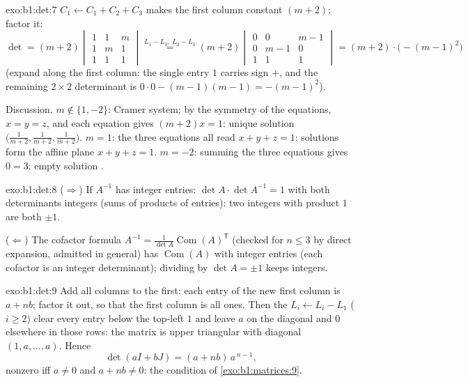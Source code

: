 \begin{solution}{exo:b1:det:7}
$C_1 \leftarrow C_1 + C_2 + C_3$ makes the first column constant
$(m+2)$; factor it:
\[
\det = (m+2)\begin{vmatrix}
1 & 1 & m\\ 1 & m & 1\\ 1 & 1 & 1
\end{vmatrix}
\overset{L_1 - L_3,\ L_2 - L_3}{=}
(m+2)\begin{vmatrix}
0 & 0 & m-1\\ 0 & m-1 & 0\\ 1 & 1 & 1
\end{vmatrix}
= (m+2)\cdot\bigl(-(m-1)^2\bigr)
\]
(expand along the first column: the single entry $1$ carries sign
$+$, and the remaining $2 \times 2$ determinant is $0 \cdot 0 -
(m-1)(m-1) = -(m-1)^2$).

Discussion. $m \notin \{1, -2\}$: Cramer system; by the symmetry of
the equations, $x = y = z$, and each equation gives $(m + 2)x = 1$:
unique solution $\bigl(\frac{1}{m+2}, \frac{1}{m+2},
\frac{1}{m+2}\bigr)$. $m = 1$: the three equations all read $x + y
+ z = 1$: solutions form the affine plane $x + y + z = 1$. $m = -2$:
summing the three equations gives $0 = 3$: empty solution .
\end{solution}

\begin{solution}{exo:b1:det:8}
($\Rightarrow$) If $A^{-1}$ has integer entries: $\det A \cdot \det
A^{-1} = 1$ with both determinants integers (sums of products of
entries): two integers with product $1$ are both $\pm1$.

($\Leftarrow$) The cofactor formula $A^{-1} = \frac{1}{\det
A}\operatorname{Com}(A)^{\mathsf T}$ (checked for $n \leq 3$ by
direct expansion, admitted in general) has
$\operatorname{Com}(A)$ with integer entries (each cofactor is an
integer determinant); dividing by $\det A = \pm 1$ keeps integers.
\end{solution}

\begin{solution}{exo:b1:det:9}
Add all columns to the first: each entry of the new first column is
$a + nb$; factor it out, so that the first column is all ones. Then
the  $L_i \leftarrow L_i - L_1$ ($i \geq 2$) clear
every entry below the top-left $1$ and leave $a$ on the diagonal and
$0$ elsewhere in those rows: the matrix is upper triangular with
diagonal $(1, a, \dots, a)$. Hence
\[
\det(aI + bJ) = (a + nb)\, a^{\,n-1} ,
\]
nonzero iff $a \neq 0$ and $a + nb \neq 0$: the condition of
\cref{exo:b1:matrices:9}.
\end{solution}

